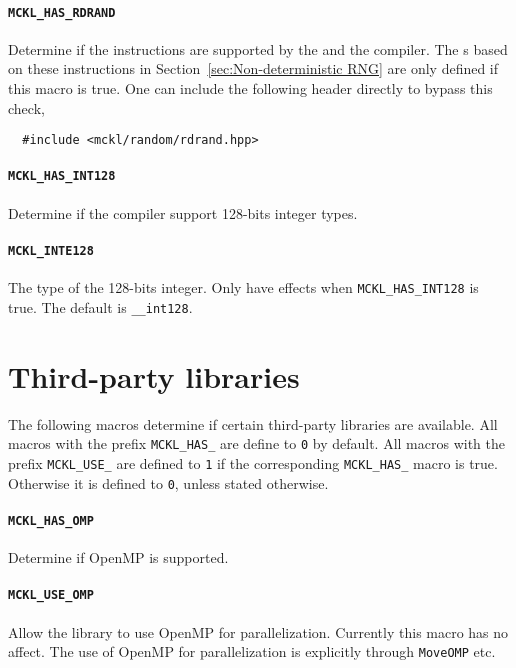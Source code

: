 \paragraph{\texttt{MCKL\_HAS\_RDRAND}} Determine if the \rdrand instructions
are supported by the \cpu and the compiler. The \rng{}s based on these
instructions in Section~\ref{sec:Non-deterministic RNG} are only defined if
this macro is true. One can include the following header directly to bypass
this check,
\begin{Verbatim}
  #include <mckl/random/rdrand.hpp>
\end{Verbatim}

\paragraph{\texttt{MCKL\_HAS\_INT128}} Determine if the compiler support
128-bits integer types.

\paragraph{\texttt{MCKL\_INTE128}} The type of the 128-bits integer. Only have
effects when \verb|MCKL_HAS_INT128| is true. The default is \verb|__int128|.

\section{Third-party libraries}
\label{sec:Third-party libraries}

The following macros determine if certain third-party libraries are available.
All macros with the prefix \verb|MCKL_HAS_| are define to \verb|0| by default.
All macros with the prefix \verb|MCKL_USE_| are defined to \verb|1| if the
corresponding \verb|MCKL_HAS_| macro is true. Otherwise it is defined to
\verb|0|, unless stated otherwise.

\paragraph{\texttt{MCKL\_HAS\_OMP}} Determine if OpenMP is supported.

\paragraph{\texttt{MCKL\_USE\_OMP}} Allow the library to use OpenMP for
parallelization. Currently this macro has no affect. The use of OpenMP for
parallelization is explicitly through \verb|MoveOMP| etc.

